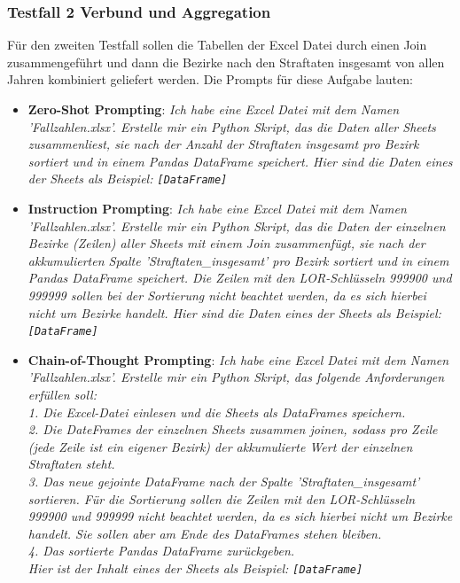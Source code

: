 \documentclass[11pt,a4paper]{article}
\begin{document}
\subsubsection{Testfall 2 Verbund und Aggregation}
    Für den zweiten Testfall sollen die Tabellen der Excel Datei durch einen Join zusammengeführt und dann die Bezirke nach den Straftaten insgesamt von allen Jahren kombiniert geliefert werden. Die Prompts für diese Aufgabe lauten:
    \begin{itemize}
        \item \textbf{Zero-Shot Prompting}: \emph{Ich habe eine Excel Datei mit dem Namen 'Fallzahlen.xlsx'. Erstelle mir ein Python Skript, das die Daten aller Sheets zusammenliest, sie nach der Anzahl der Straftaten insgesamt pro Bezirk sortiert und in einem Pandas DataFrame speichert. Hier sind die Daten eines der Sheets als Beispiel: \texttt{[DataFrame]}}
        \item \textbf{Instruction Prompting}: \emph{Ich habe eine Excel Datei mit dem Namen 'Fallzahlen.xlsx'. Erstelle mir ein Python Skript, das die Daten der einzelnen Bezirke (Zeilen) aller Sheets mit einem Join zusammenfügt, sie nach der akkumulierten Spalte 'Straftaten\_insgesamt' pro Bezirk sortiert und in einem Pandas DataFrame speichert. Die Zeilen mit den LOR-Schlüsseln 999900 und 999999 sollen bei der Sortierung nicht beachtet werden, da es sich hierbei nicht um Bezirke handelt. Hier sind die Daten eines der Sheets als Beispiel: \texttt{[DataFrame]}}
        \item \textbf{Chain-of-Thought Prompting}: \emph{Ich habe eine Excel Datei mit dem Namen 'Fallzahlen.xlsx'. Erstelle mir ein Python Skript, das folgende Anforderungen erfüllen soll:\\ 1. Die Excel-Datei einlesen und die Sheets als DataFrames speichern.\\ 2. Die DateFrames der einzelnen Sheets zusammen joinen, sodass pro Zeile (jede Zeile ist ein eigener Bezirk) der akkumulierte Wert der einzelnen Straftaten steht.\\ 3. Das neue gejointe DataFrame nach der Spalte 'Straftaten\_insgesamt' sortieren. Für die Sortierung sollen die Zeilen mit den LOR-Schlüsseln 999900 und 999999 nicht beachtet werden, da es sich hierbei nicht um Bezirke handelt. Sie sollen aber am Ende des DataFrames stehen bleiben.\\ 4. Das sortierte Pandas DataFrame zurückgeben.\\ Hier ist der Inhalt eines der Sheets als Beispiel: \texttt{[DataFrame]}}
    \end{itemize}
\end{document}
